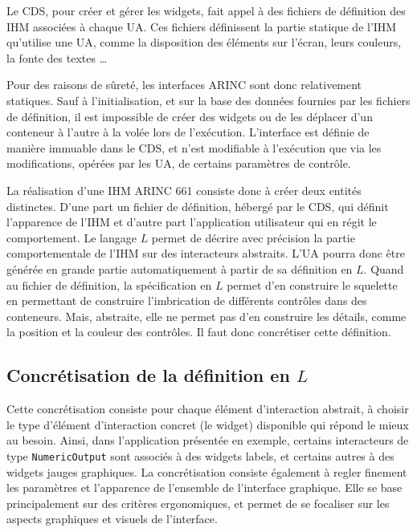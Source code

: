 \documentclass{ihm}
\begin{document}
Le CDS, pour créer et gérer les  widgets, fait appel à des fichiers de
définition des IHM associées à chaque UA.  Ces fichiers définissent la
partie statique de  l'IHM qu'utilise une UA, comme  la disposition des
éléments sur l'écran, leurs couleurs, la fonte des textes \ldots 

Pour  des   raisons  de  sûreté,   les  interfaces  ARINC   sont  donc
relativement statiques.  Sauf  à l'initialisation, et sur  la base des
données fournies par les fichiers  de définition, il est impossible de
créer des  widgets ou de  les déplacer d'un  conteneur à l'autre  à la
volée lors de l'exécution. L'interface est définie de manière immuable
dans  le  CDS,   et  n'est  modifiable  à  l'exécution   que  via  les
modifications, opérées par les UA, de certains paramètres de contrôle.

La réalisation d'une IHM ARINC 661  consiste donc à créer deux entités
distinctes.  D'une part un fichier  de définition, hébergé par le CDS,
qui  définit  l'apparence  de  l'IHM  et  d'autre  part  l'application
utilisateur qui  en régit  le comportement. Le  langage $L$  permet de
décrire  avec précision  la partie  comportementale de  l'IHM sur  des
interacteurs abstraits. L'UA pourra donc être générée en grande partie
automatiquement à partir de sa définition en $L$.  Quand au fichier de
définition,  la  spécification  en   $L$  permet  d'en  construire  le
squelette  en permettant  de  construire  l'imbrication de  différents
contrôles dans  des conteneurs.  Mais, abstraite,  elle ne  permet pas
d'en  construire les  détails, comme  la  position et  la couleur  des
contrôles. Il faut donc concrétiser cette définition. 

\subsection{Concrétisation de la définition en $L$} 
\label{sec:concretisation}

Cette  concrétisation  consiste   pour  chaque  élément  d'interaction
abstrait,  à  choisir  le  type d'élément  d'interaction  concret  (le
widget)  disponible  qui  répond  le mieux  au  besoin.   Ainsi,  dans
l'application  présentée en  exemple,  certains  interacteurs de  type
\lstinline$NumericOutput$  sont  associés  à des  widgets  labels,  et
certains autres  à des  widgets jauges graphiques.   La concrétisation
consiste également à regler finement  les paramètres et l'apparence de
l'ensemble de  l'interface graphique. Elle se  base principalement sur
des critères ergonomiques,  et permet de se focaliser  sur les aspects
graphiques et visuels de l'interface.
\end{document}
